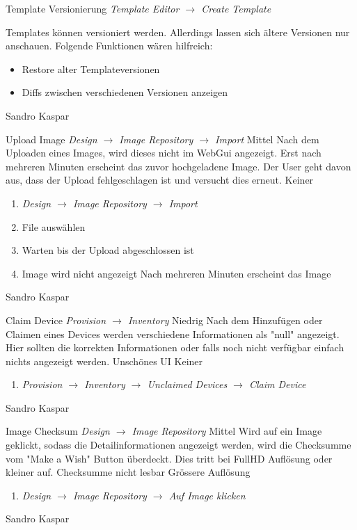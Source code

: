 \featureRequest
{Template Versionierung}
{\textit{Template Editor $\rightarrow$ Create Template}}
{Templates können versioniert werden. Allerdings lassen sich ältere Versionen nur anschauen. Folgende Funktionen wären hilfreich:
\begin{itemize}
	\item Restore alter Templateversionen
	\item Diffs zwischen verschiedenen Versionen anzeigen
\end{itemize}
}
{Sandro Kaspar}
{}

\bugreport
{Upload Image}
{\textit{Design $\rightarrow$ Image Repository $\rightarrow$ Import}}
{Mittel}
{Nach dem Uploaden eines Images, wird dieses nicht im WebGui angezeigt. Erst nach mehreren Minuten erscheint das zuvor hochgeladene Image.
}
{Der User geht davon aus, dass der Upload fehlgeschlagen ist und versucht dies erneut.}
{Keiner}
{
	\begin{enumerate}
		\item \textit{Design $\rightarrow$ Image Repository $\rightarrow$ Import}
		\item File auswählen
		\item Warten bis der Upload abgeschlossen ist
		\item Image wird nicht angezeigt
		\subitem Nach mehreren Minuten erscheint das Image
	\end{enumerate}
}
{Sandro Kaspar}
{}


\bugreport
{Claim Device}
{\textit{Provision $\rightarrow$ Inventory}}
{Niedrig}
{Nach dem Hinzufügen oder Claimen eines Devices werden verschiedene Informationen als "null" angezeigt. Hier sollten die korrekten Informationen oder falls noch nicht verfügbar einfach nichts angezeigt werden.
}
{Unschönes UI}
{Keiner}
{
	\begin{enumerate}
		\item \textit{Provision $\rightarrow$ Inventory $\rightarrow$ Unclaimed Devices $\rightarrow$ Claim Device}
	\end{enumerate}
}
{Sandro Kaspar}
{}

\bugreport
{Image Checksum}
{\textit{Design $\rightarrow$ Image Repository}}
{Mittel}
{Wird auf ein Image geklickt, sodass die Detailinformationen angezeigt werden, wird die Checksumme vom "Make a Wish" Button überdeckt. Dies tritt bei FullHD Auflösung oder kleiner auf.
}
{Checksumme nicht lesbar}
{Grössere Auflösung}
{
	\begin{enumerate}
		\item \textit{Design $\rightarrow$ Image Repository $\rightarrow$ Auf Image klicken}
	\end{enumerate}
}
{Sandro Kaspar}
{}


